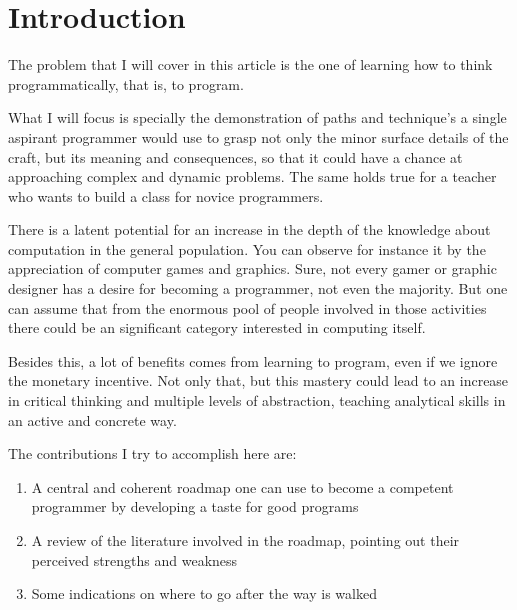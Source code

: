 \section{Introduction}
The problem that I will cover in this article is the one of learning how to
think programmatically, that is, to program.

What I will focus is specially the demonstration of paths and technique's
a single aspirant programmer would use to grasp not only the minor surface
details of the craft, but its meaning and consequences, so that it could have a
chance at approaching complex and dynamic problems. The same holds true for a
teacher who wants to build a class for novice programmers.

There is a latent potential for an increase in the depth of the knowledge about
computation in the general population. You can observe for instance it by the
appreciation of computer games and graphics. Sure, not every gamer or graphic
designer has a desire for becoming a programmer, not even the majority. But one
can assume that from the enormous pool of people involved in those activities
there could be an significant category interested in computing itself.

Besides this, a lot of benefits comes from learning to program, even if we
ignore the monetary incentive. \cite{education:sussman__why_programming_is_a_good_medium}
Not only that, but this mastery could lead to an increase in critical thinking
and multiple levels of abstraction, teaching analytical skills in an active and
concrete way. \cite{education:felleisen__htdp}



The contributions I try to accomplish here are:

\begin{enumerate}
    \item A central and coherent roadmap one can use to become a competent
    programmer by developing a taste for good programs

    \item A review of the literature involved in the roadmap, pointing out their
    perceived strengths and weakness

    \item Some indications on where to go after the way is walked
\end{enumerate}

